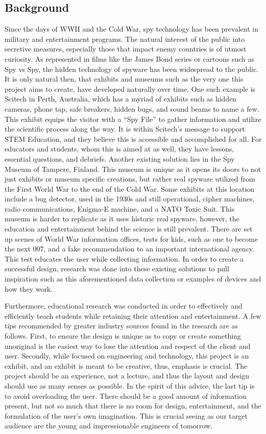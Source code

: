 \documentclass[conference]{IEEEtran}
\begin{document}
\subsection{Background}

\par Since the days of WWII and the Cold War, spy technology has been prevalent in military and entertainment programs. The natural interest of the public into secretive measures, especially those that impact enemy countries is of utmost curiosity. As represented in films like the James Bond series or cartoons such as Spy vs Spy, the hidden technology of spyware has been widespread to the public. It is only natural then, that exhibits and museums such as the very one this project aims to create, have developed naturally over time. One such example is Scitech in Perth, Australia, which has a myriad of exhibits such as hidden cameras, phone tap, safe breakers, hidden bugs, and sound beams to name a few. This exhibit equips the visitor with a “Spy File” to gather information and utilize the scientific process along the way. It is within Scitech’s message to support STEM Education, and they believe this is accessible and accomplished for all. For educators and students, whom this is aimed at as well, they have lessons, essential questions, and debriefs. Another existing solution lies in the Spy Museum of Tampere, Finland. This museum is unique as it opens its doors to not just exhibits or museum specific creations, but rather real spyware utilized from the First World War to the end of the Cold War. Some exhibits at this location include a bug detector, used in the 1930s and still operational, cipher machines, radio communications, Enigma-E machine, and a NATO Toxic Suit. This museum is harder to replicate as it uses historic real spyware, however, the education and entertainment behind the science is still prevalent. There are set up scenes of World War information offices, tests for kids, such as one to become the next 007, and a fake recommendation to an important international agency. This test educates the user while collecting information. In order to create a successful design, research was done into these existing solutions to pull inspiration such as this aforementioned data collection or examples of devices and how they work.
\par  Furthermore, educational research was conducted in order to effectively and efficiently teach students while retaining their attention and entertainment. A few tips recommended by greater industry sources found in the research are as follows. First, to ensure the design is unique as to copy or create something unoriginal is the easiest way to lose the attention and respect of the client and user. Secondly, while focused on engineering and technology, this project is an exhibit, and an exhibit is meant to be creative, thus, emphasis is crucial. The project should be an experience, not a lecture, and thus the layout and design should use as many senses as possible. In the spirit of this advice, the last tip is to avoid overloading the user. There should be a good amount of information present, but not so much that there is no room for design, entertainment, and the formulation of the user’s own imagination. This is crucial seeing as our target audience are the young and impressionable engineers of tomorrow.
\end{document}
